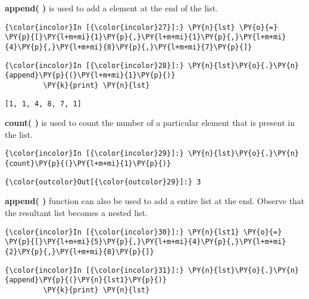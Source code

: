     \textbf{append( )} is used to add a element at the end of the list.

    \begin{Verbatim}[commandchars=\\\{\}]
{\color{incolor}In [{\color{incolor}27}]:} \PY{n}{lst} \PY{o}{=} \PY{p}{[}\PY{l+m+mi}{1}\PY{p}{,}\PY{l+m+mi}{1}\PY{p}{,}\PY{l+m+mi}{4}\PY{p}{,}\PY{l+m+mi}{8}\PY{p}{,}\PY{l+m+mi}{7}\PY{p}{]}
\end{Verbatim}

    \begin{Verbatim}[commandchars=\\\{\}]
{\color{incolor}In [{\color{incolor}28}]:} \PY{n}{lst}\PY{o}{.}\PY{n}{append}\PY{p}{(}\PY{l+m+mi}{1}\PY{p}{)}
         \PY{k}{print} \PY{n}{lst}
\end{Verbatim}

    \begin{Verbatim}[commandchars=\\\{\}]
[1, 1, 4, 8, 7, 1]
    \end{Verbatim}

    \textbf{count( )} is used to count the number of a particular element
that is present in the list.

    \begin{Verbatim}[commandchars=\\\{\}]
{\color{incolor}In [{\color{incolor}29}]:} \PY{n}{lst}\PY{o}{.}\PY{n}{count}\PY{p}{(}\PY{l+m+mi}{1}\PY{p}{)}
\end{Verbatim}

            \begin{Verbatim}[commandchars=\\\{\}]
{\color{outcolor}Out[{\color{outcolor}29}]:} 3
\end{Verbatim}
        
    \textbf{append( )} function can also be used to add a entire list at the
end. Observe that the resultant list becomes a nested list.

    \begin{Verbatim}[commandchars=\\\{\}]
{\color{incolor}In [{\color{incolor}30}]:} \PY{n}{lst1} \PY{o}{=} \PY{p}{[}\PY{l+m+mi}{5}\PY{p}{,}\PY{l+m+mi}{4}\PY{p}{,}\PY{l+m+mi}{2}\PY{p}{,}\PY{l+m+mi}{8}\PY{p}{]}
\end{Verbatim}

    \begin{Verbatim}[commandchars=\\\{\}]
{\color{incolor}In [{\color{incolor}31}]:} \PY{n}{lst}\PY{o}{.}\PY{n}{append}\PY{p}{(}\PY{n}{lst1}\PY{p}{)}
         \PY{k}{print} \PY{n}{lst}
\end{Verbatim}

